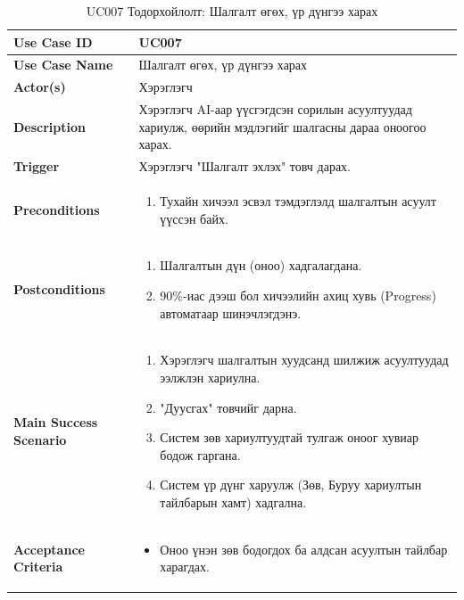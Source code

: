 \begin{longtable}{|p{4cm}|p{11cm}|}
\caption{UC007 Тодорхойлолт: Шалгалт өгөх, үр дүнгээ харах} \\
\hline
\textbf{Use Case ID} & UC007 \\ \hline
\textbf{Use Case Name} & Шалгалт өгөх, үр дүнгээ харах \\ \hline
\textbf{Actor(s)} & Хэрэглэгч \\ \hline
\textbf{Description} & Хэрэглэгч AI-аар үүсгэгдсэн сорилын асуултуудад хариулж, өөрийн мэдлэгийг шалгасны дараа оноогоо харах. \\ \hline
\textbf{Trigger} & Хэрэглэгч "Шалгалт эхлэх" товч дарах. \\ \hline
\textbf{Preconditions} & 
\begin{enumerate}
    \item Тухайн хичээл эсвэл тэмдэглэлд шалгалтын асуулт үүссэн байх.
\end{enumerate} \\ \hline
\textbf{Postconditions} & 
\begin{enumerate}
    \item Шалгалтын дүн (оноо) хадгалагдана.
    \item 90\%-иас дээш бол хичээлийн ахиц хувь (Progress) автоматаар шинэчлэгдэнэ.
\end{enumerate} \\ \hline
\textbf{Main Success Scenario} & 
\begin{enumerate}
    \item Хэрэглэгч шалгалтын хуудсанд шилжиж асуултуудад ээлжлэн хариулна.
    \item "Дуусгах" товчийг дарна.
    \item Систем зөв хариултуудтай тулгаж оноог хувиар бодож гаргана.
    \item Систем үр дүнг харуулж (Зөв, Буруу хариултын тайлбарын хамт) хадгална.
\end{enumerate} \\ \hline
\textbf{Acceptance Criteria} & 
\begin{itemize}
    \item Оноо үнэн зөв бодогдох ба алдсан асуултын тайлбар харагдах.
\end{itemize} \\ \hline
\end{longtable}

